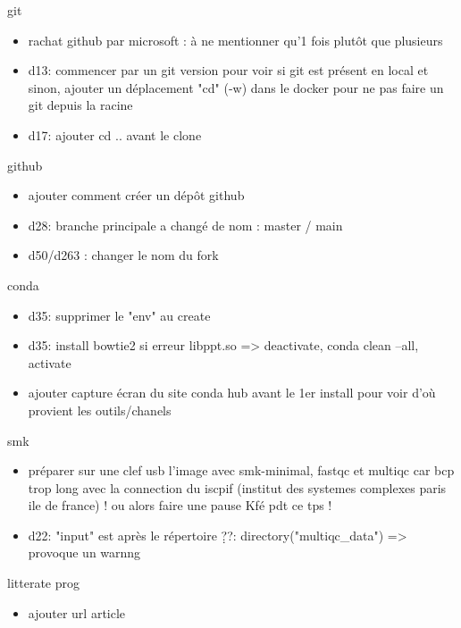 

\begin{frame}{git}
\begin{itemize}
  \item rachat github par microsoft : à ne mentionner qu'1 fois plutôt que plusieurs
  \item d13: commencer par un git version pour voir si git est présent en local et sinon, ajouter un déplacement "cd" (-w) dans le docker pour ne pas faire un git depuis la racine
  \item d17: ajouter cd .. avant le clone
\end{itemize}
\end{frame}
\begin{frame}{github}
\begin{itemize}
  \item ajouter comment créer un dépôt github
  \item d28: branche principale a changé de nom : master / main
  \item d50/d263 : changer le nom du fork
\end{itemize}
\end{frame}
\begin{frame}{conda}
\begin{itemize}
  \item d35: supprimer le "env" au create
  \item d35: install bowtie2 si erreur libppt.so => deactivate, conda clean --all, activate
  \item ajouter capture écran du site conda hub avant le 1er install pour voir d'où provient les outils/chanels
\end{itemize}
\end{frame}
\begin{frame}{smk}
\begin{itemize}
    \item préparer sur une clef usb l'image avec smk-minimal, fastqc et multiqc car bcp trop long avec la connection du iscpif  (institut des systemes complexes paris ile de france) ! ou alors faire une pause Kfé pdt ce tps !
    \item d22: "input" est après le répertoire
    \d??: directory("multiqc_data") => provoque un warnng 
\end{itemize}
\end{frame}
\begin{frame}{litterate prog}
\begin{itemize}
    \item ajouter url article
\end{itemize}
\end{frame}
